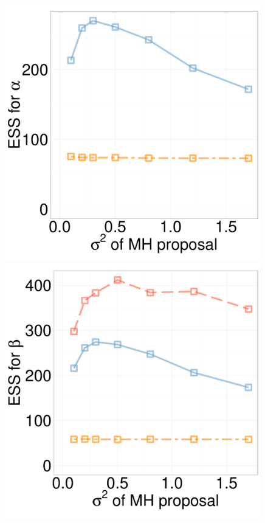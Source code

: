 \begin{figure}[H]
\begin{minipage}[hp]{0.24\linewidth}
	\end{minipage}
  \begin{minipage}[hp]{0.24\linewidth}
  \centering
    \includegraphics [width=0.99\textwidth, angle=0]{figs/ess/QC_D10alpha_k2.pdf}
	\end{minipage}
  \begin{minipage}[hp]{0.24\linewidth}
  \centering
    \includegraphics [width=0.99\textwidth, angle=0]{figs/ess/QC_D10beta_k2.pdf}

\end{minipage}
\end{figure}
